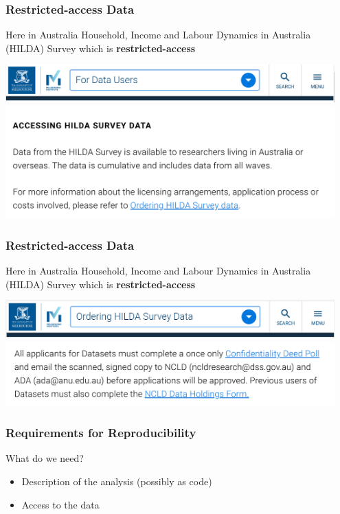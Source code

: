 \begin{frame}
\frametitle{Restricted-access Data}
\begin{block}{Here in Australia}
	Household, Income and Labour Dynamics in Australia (HILDA) Survey \textellipsis which is \textbf{restricted-access}
\end{block}
\begin{center}
\includegraphics[width=0.95\textwidth]{images/hilda-screenshot2.png}
		\includegraphics[width=0.95\textwidth]{images/hilda-screenshot3.png}
\end{center}
\end{frame}



\begin{frame}
\frametitle{Restricted-access Data}
\begin{block}{Here in Australia}
	Household, Income and Labour Dynamics in Australia (HILDA) Survey \textellipsis which is \textbf{restricted-access}
\end{block}
\begin{center}
	\includegraphics[width=0.95\textwidth]{images/hilda-screenshot4.png}
	\includegraphics[width=0.95\textwidth]{images/hilda-screenshot5.png}
\end{center}
\end{frame}



\begin{frame}
\frametitle{Requirements for Reproducibility}
\begin{block}{What do we need?}
\begin{itemize}
	\item Description of the analysis (possibly as code)
	\item Access to the data
\end{itemize}
\end{block}
\end{frame}



